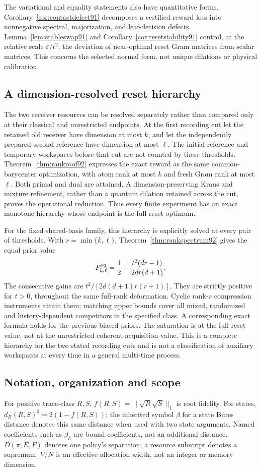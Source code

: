 The variational and equality statements also have quantitative forms.
Corollary~\ref{cor:contactdefect91} decomposes a certified reward loss
into nonnegative spectral, majorization, and leaf-decision defects.
Lemma~\ref{lem:stableswap91} and Corollary~\ref{cor:resetstability91}
control, at the relative scale $\varepsilon/t^2$, the deviation of
near-optimal reset Gram matrices from scalar matrices.  This concerns
the selected normal form, not unique dilations or physical calibration.


\subsection{A dimension-resolved reset hierarchy}
The two receiver resources can be resolved separately rather than
compared only at their classical and unrestricted endpoints.
At the first recording cut let the retained old receiver have dimension
at most $k$, and let the independently prepared second reference have
dimension at most $\ell$.  The initial reference and temporary
workspaces before that cut are not counted by these thresholds.
Theorem~\ref{thm:rankroof92} expresses the exact reward as the same
common-barycenter optimization, with atom rank at most $k$ and fresh
Gram rank at most $\ell$.  Both primal and dual are attained.
A dimension-preserving Kraus and mixture refinement, rather than a
quantum dilation retained across the cut, proves the operational
reduction.  Thus every finite experiment has an exact monotone
hierarchy whose endpoint is the full reset optimum.

For the fixed shared-basis family, this hierarchy is explicitly solved
at every pair of thresholds.  With $r=\min\{k,\ell\}$,
Theorem~\ref{thm:rankspectrum92} gives the equal-prior value
\[
 P_{k,\ell}^{\rm eq}=\frac12+\frac{t^2(dr-1)}{2dr(d+1)}.
\]
The consecutive gains are $t^2/[2d(d+1)r(r+1)]$.  They are strictly
positive for $t>0$, throughout the same full-rank deformation.
Cyclic rank-$r$ compression instruments attain them; matching upper
bounds cover all mixed, randomized and history-dependent competitors
in the specified class.  A corresponding exact formula holds for the
previous biased priors.  The saturation is at the full reset value,
not at the unrestricted coherent-acquisition value.  This is a
complete hierarchy for the two stated recording cuts and is not a
classification of auxiliary workspaces at every time in a general
multi-time process.

\subsection{Notation, organization and scope}
For positive trace-class $R,S$, $f(R,S)=\|\sqrt R\sqrt S\|_1$ is root
fidelity.  For states, $d_B(R,S)^2=2(1-f(R,S))$; the inherited symbol
$\beta$ for a state Bures distance denotes this same distance when used
with two state arguments.  Named coefficients such as $\beta_h$ are
bound coefficients, not an additional distance.  $D(\pi;E,F)$ denotes
one policy's separation; a resource subscript denotes a supremum.
$V/N$ is an effective allocation width, not an integer or memory dimension.

